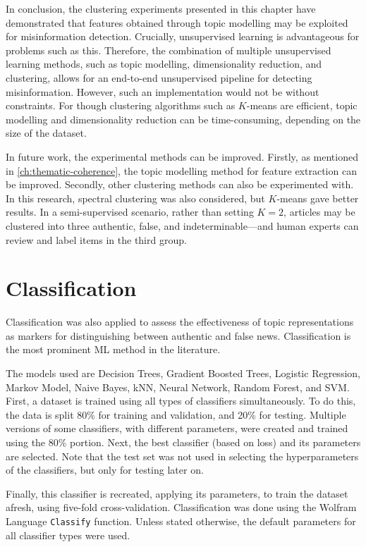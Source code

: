 In conclusion, the clustering experiments presented in this chapter have demonstrated that features obtained through topic modelling may be exploited for misinformation detection. Crucially, unsupervised learning is advantageous for problems such as this. Therefore, the combination of multiple unsupervised learning methods, such as topic modelling, dimensionality reduction, and clustering, allows for an end-to-end unsupervised pipeline for detecting misinformation. However, such an implementation would not be without constraints. For though clustering algorithms such as $K$-means are efficient, topic modelling and dimensionality reduction can be time-consuming, depending on the size of the dataset.

In future work, the experimental methods can be improved. Firstly, as mentioned in \autoref{ch:thematic-coherence}, the topic modelling method for feature extraction can be improved. Secondly, other clustering methods can also be experimented with. In this research, spectral clustering was also considered, but $K$-means gave better results. In a semi-supervised scenario, rather than setting $K = 2$, articles may be clustered into three authentic, false, and indeterminable—and human experts can review and label items in the third group.

\section{Classification}
\label{sec:5-classification}

Classification was also applied to assess the effectiveness of topic representations as markers for distinguishing between authentic and false news. Classification is the most prominent \ac{ML} method in the literature.

The models used are Decision Trees, Gradient Boosted Trees, Logistic Regression, Markov Model, Naive Bayes, \ac{kNN}, Neural Network, Random Forest, and \ac{SVM}. First, a dataset is trained using all types of classifiers simultaneously. To do this, the data is split 80\% for training and validation, and 20\% for testing. Multiple versions of some classifiers, with different parameters, were created and trained using the 80\% portion. Next, the best classifier (based on loss) and its parameters are selected. Note that the test set was not used in selecting the hyperparameters of the classifiers, but only for testing later on.

Finally, this classifier is recreated, applying its parameters, to train the dataset afresh, using five-fold cross-validation. Classification was done using the Wolfram Language \texttt{Classify} function. Unless stated otherwise, the default parameters for all classifier types were used.

